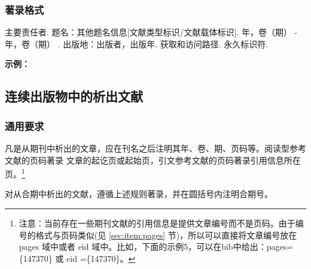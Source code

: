 \documentclass[twoside]{article}%
\begin{document}
\subsubsection{著录格式}

主要责任者. 题名：其他题名信息[文献类型标识/文献载体标识]. 年，卷（期） -年，卷（期） .
出版地：出版者，出版年. 获取和访问路径. 永久标识符.



\begin{refsection}

\nocite{
中华医学会湖北分会1984----,
中国图书馆学会1957--1990--,
AAAS1883----,
Publiclibrary1979}


\textbf{示例：}

{\printbibliography[heading=none,env=indentegenv]}
\end{refsection}

\subsection{连续出版物中的析出文献}\label{sec:entrytype:article}

\subsubsection{通用要求}\label{sec:article:request}

凡是从期刊中析出的文章，应在刊名之后注明其年、卷、期、页码等。阅读型参考文献的页码著录
文章的起讫页或起始页，引文参考文献的页码著录引用信息所在页。\footnote{注意：当前存在一些期刊文献的引用信息是提供文章编号而不是页码。由于编号的格式与页码类似(见 \ref{sec:item:pages} 节)，所以可以直接将文章编号放在 pages 域中或者 eid 域中。比如，下面的示例5，可以在bib中给出：pages=\{147370\} 或  eid =\{147370\}。}

\begin{refsection}

\nocite{egdatevolnumpagea--,egdatevolnumpageb--,%
egdatevolnumpagec--,egdatevolnumpaged--,egdatevolnumpageg--,egdatevolnumpageh--}

{}
\end{refsection}

对从合期中析出的文献，遵循上述规则著录，并在圆括号内注明合期号。

\begin{refsection}
\nocite{egdatevolnumpagee--}

{}
\end{refsection}
\end{document}
